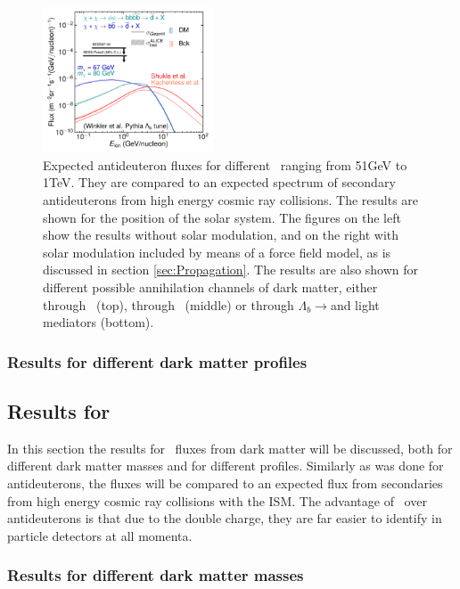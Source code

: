 \begin{figure}
    \includegraphics[width=0.45\textwidth]{figures/blambdadbarPaperTOA.pdf}
    \caption{Expected antideuteron fluxes for different \dmm\ ranging from 51GeV to 1TeV. They are compared to an expected spectrum of secondary antideuterons from high energy cosmic ray collisions. The results are shown for the position of the solar system. The figures on the left show the results without solar modulation, and on the right with solar modulation included by means of a force field model, as is discussed in section \ref{sec:Propagation}. The results are also shown for different possible annihilation channels of dark matter, either through \WW\ (top), through \bb\ (middle) or through $\Lambda_b \rightarrow $\bb and light mediators (bottom).}
    \label{fig:Results_dbar_fluxes_diff_DM_masses}
\end{figure}


\subsubsection{Results for different dark matter profiles}


\subsection{Results for \ahe}
In this section the results for \ahe\ fluxes from dark matter will be discussed, both for different dark matter masses and for different profiles. Similarly as was done for antideuterons, the fluxes will be compared to an expected flux from secondaries from high energy cosmic ray collisions with the ISM. The advantage of \ahe\   over antideuterons is that due to the double charge, they are far easier to identify in particle detectors at all momenta.
\subsubsection{Results for different dark matter masses}

